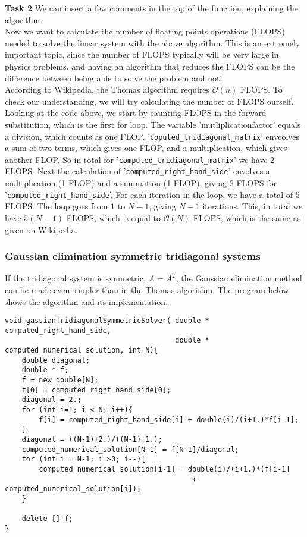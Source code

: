 \documentclass{article}
\begin{document}
\textbf{Task 2} We can insert a few comments in the top of the function, explaining the algorithm. \\

Now we want to calculate the number of floating points operations (FLOPS) needed to solve the linear system with the above algorithm. This is an extremely important topic, since the number of FLOPS typically will be very large in physics problems, and having an algorithm that reduces the FLOPS can be the difference between being able to solve the problem and not!\\

According to Wikipedia, the Thomas algorithm requires $\mathcal{O}(n)$ FLOPS. To check our understanding, we will try calculating the number of FLOPS ourself. Looking at the code above, we start by caunting FLOPS in the forward substitution, which is the first for loop. The variable 'mutliplicationfactor' equals a division, which counts as one FLOP. '\texttt{coputed\_tridiagonal\_matrix}' enveolves a sum of two terms, which gives one FLOP, and a multiplication, which gives another FLOP. So in total for '\texttt{computed\_tridiagonal\_matrix}' we have 2 FLOPS. Next the calculation of '\texttt{computed\_right\_hand\_side}' envolves a multiplication (1 FLOP) and a summation (1 FLOP), giving 2 FLOPS for '\texttt{computed\_right\_hand\_side}'. For each iteration in the loop, we have a total of 5 FLOPS. The loop goes from $1$ to $N-1$, giving $N-1$ iterations. This, in total we have $5(N-1)$ FLOPS, which is equal to $\mathcal{O}(N)$ FLOPS, which is the same as given on Wikipedia.

\subsubsection{Gaussian elimination symmetric tridiagonal systems}
If the tridiagonal system is symmetric, $A = A^T$, the Gaussian elimination method can be made even simpler than in the Thomas algorithm. The program below shows the algorithm and its implementation.

\begin{lstlisting}
void gassianTridiagonalSymmetricSolver( double * computed_right_hand_side, 
										double * computed_numerical_solution, int N){
    double diagonal;
    double * f;
    f = new double[N];
    f[0] = computed_right_hand_side[0];
    diagonal = 2.;
    for (int i=1; i < N; i++){
        f[i] = computed_right_hand_side[i] + double(i)/(i+1.)*f[i-1];
    }
    diagonal = ((N-1)+2.)/((N-1)+1.);
    computed_numerical_solution[N-1] = f[N-1]/diagonal;
    for (int i = N-1; i >0; i--){
        computed_numerical_solution[i-1] = double(i)/(i+1.)*(f[i-1] 
        									+ computed_numerical_solution[i]);
    }

    delete [] f;
}
\end{lstlisting}
\end{document}
